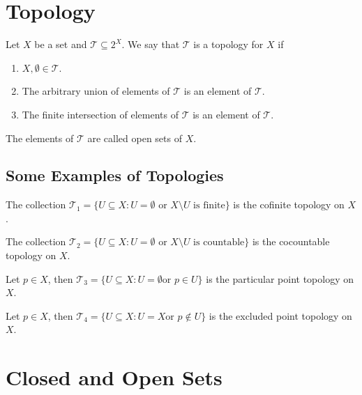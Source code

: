 \section{Topology}

\begin{definition}[Topology]
  Let \(X\) be a set and \(\mathcal T \subseteq 2^X\). We say that \(\mathcal
  T\) is a topology for \(X\) if
  \begin{enumerate}[(T1)]
    \item \(X, \emptyset \in \mathcal T\).
    \item The arbitrary union of elements of \(\mathcal T\) is an element of
      \(\mathcal T\). 
    \item The finite intersection of elements of \(\mathcal T\) is an element of
      \(\mathcal T\).
  \end{enumerate}
  The elements of \(\mathcal T\) are called open sets of \(X\).
\end{definition}

\subsection{Some Examples of Topologies}

\begin{example}
  The collection \(\mathcal T_1 = \{U \subseteq X : U = \emptyset \text{ or } X
  \setminus U \text{ is finite}\}\) is the cofinite topology on \(X\).
\end{example}

\begin{example}
  The collection \(\mathcal T_2 = \{U \subseteq X : U = \emptyset \text{ or } X
  \setminus U \text{ is countable}\}\) is the cocountable topology on \(X\).
\end{example}

\begin{example}
  Let \(p \in X\), then \(\mathcal T_3 = \{U \subseteq X : U = \emptyset \text{
  or } p \in U\}\) is the particular point topology on \(X\).
\end{example}

\begin{example}
  Let \(p \in X\), then \(\mathcal T_4 = \{U \subseteq X : U = X \text{
  or } p \not\in U\}\) is the excluded point topology on \(X\).
\end{example}

\section{Closed and Open Sets}

